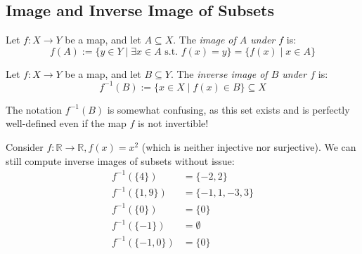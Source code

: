 \begin{center}
\end{center}

\subsection{Image and Inverse Image of Subsets}

\begin{definition}Let $f: X \to Y$ be a map, and let $A \subseteq X$. The \textit{image of $A$ under $f$} is:
\[
f(A) := \{y \in Y \mid \exists x \in A \text{ s.t. } f(x) = y\} = \{f(x) \mid x \in A\}
\]
\end{definition}

\begin{definition}
Let $f: X \to Y$ be a map, and let $B \subseteq Y$. The \textit{inverse image of $B$ under $f$} is:
\[
f^{-1}(B) := \{x \in X \mid f(x) \in B\} \subseteq X
\]
\end{definition}

\begin{importantremark}
The notation $f^{-1}(B)$ is somewhat confusing, as this set exists and is perfectly well-defined even if the map $f$ is not invertible!
\end{importantremark}

\begin{example}
Consider $f: \mathbb{R} \to \mathbb{R}, f(x) = x^2$ (which is neither injective nor surjective). We can still compute inverse images of subsets without issue:
\begin{align*}
f^{-1}(\{4\}) &= \{-2, 2\} \\
f^{-1}(\{1, 9\}) &= \{-1, 1, -3, 3\} \\
f^{-1}(\{0\}) &= \{0\} \\
f^{-1}(\{-1\}) &= \emptyset \\
f^{-1}(\{-1, 0\}) &= \{0\}
\end{align*}
\end{example}


